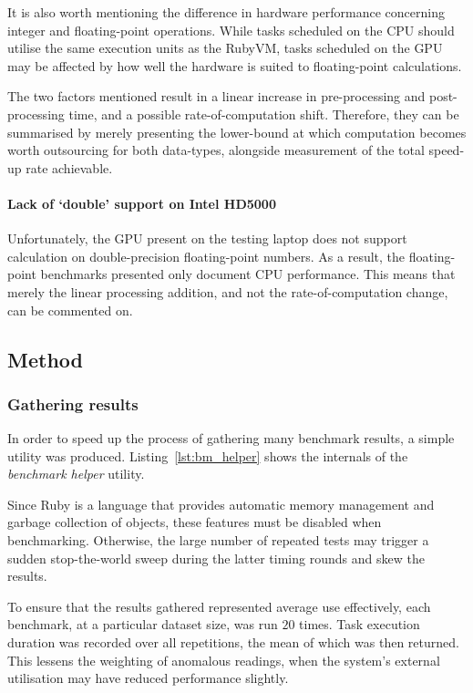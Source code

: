  It is also worth mentioning the difference in hardware performance concerning integer and floating-point operations. While tasks scheduled on the \ac{CPU} should utilise the same execution units as the RubyVM, tasks scheduled on the \ac{GPU} may be affected by how well the hardware is suited to floating-point calculations.

 The two factors mentioned result in a linear increase in pre-processing and post-processing time, and a possible rate-of-computation shift. Therefore, they can be summarised by merely presenting the lower-bound at which computation becomes worth outsourcing for both data-types, alongside measurement of the total speed-up rate achievable.

 \paragraph*{Lack of `double' support on Intel HD5000}
 Unfortunately, the \ac{GPU} present on the testing laptop does not support calculation on double-precision floating-point numbers.
 As a result, the floating-point benchmarks presented only document \ac{CPU} performance. This means that merely the linear processing addition, and not the rate-of-computation change, can be commented on.

\subsection{Method}
\subsubsection{Gathering results}
In order to speed up the process of gathering many benchmark results, a simple utility was produced. Listing~\ref{lst:bm_helper} shows the internals of the \emph{benchmark helper} utility.

Since Ruby is a language that provides automatic memory management and garbage collection of objects, these features must be disabled when benchmarking. Otherwise, the large number of repeated tests may trigger a sudden stop-the-world sweep during the latter timing rounds and skew the results.

To ensure that the results gathered represented average use effectively, each benchmark, at a particular dataset size,  was run $20$ times. Task execution duration was recorded over all repetitions, the mean of which was then returned. This lessens the weighting of anomalous readings, when the system's external utilisation may have reduced performance slightly.


